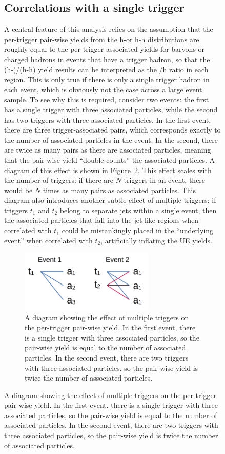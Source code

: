 \begin{figure}
\subsection{Correlations with a single trigger}
\label{sec:single_trigger_correlations}

A central feature of this analysis relies on the assumption that the per-trigger pair-wise yields from the h-\lmb or h-h distributions are roughly equal to the per-trigger associated yields for \lmb baryons or charged hadrons in events that have a trigger hadron, so that the (h-\lmb)/(h-h) yield results can be interpreted as the \lmb/h ratio in each region. This is only true if there is only a single trigger hadron in each event, which is obviously not the case across a large event sample. To see why this is required, consider two events: the first has a single trigger with three associated particles, while the second has two triggers with three associated particles. In the first event, there are three trigger-associated pairs, which corresponds exactly to the number of associated particles in the event. In the second, there are twice as many pairs as there are associated particles, meaning that the pair-wise yield ``double counts'' the associated particles. A diagram of this effect is shown in Figure~\ref{fig:pairwise_counting}. This effect scales with the number of triggers: if there are $N$ triggers in an event, there would be $N$ times as many pairs as associated particles. This diagram also introduces another subtle effect of multiple triggers: if triggers $t_1$ and $t_2$ belong to separate jets within a single event, then the associated particles that fall into the jet-like regions when correlated with $t_1$ could be mistankingly placed in the ``underlying event'' when correlated with $t_2$, artificially inflating the UE yields.

\begin{figure}[ht]
    \centering
    \includegraphics[width=0.7\textwidth]{figures/analysis/pair_counting_diagram.png}
    \caption{A diagram showing the effect of multiple triggers on the per-trigger pair-wise yield. In the first event, there is a single trigger with three associated particles, so the pair-wise yield is equal to the number of associated particles. In the second event, there are two triggers with three associated particles, so the pair-wise yield is twice the number of associated particles.}
    \label{fig:pairwise_counting}
\end{figure}


\end{figure}

